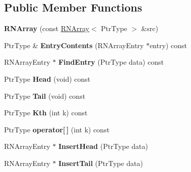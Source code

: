 \subsection*{Public Member Functions}
\begin{DoxyCompactItemize}
\item 
{\bfseries R\+N\+Array} (const \hyperlink{class_r_n_array}{R\+N\+Array}$<$ Ptr\+Type $>$ \&src)\hypertarget{class_r_n_array_ac2eee7cfca9c362f03465d1bc3858696}{}\label{class_r_n_array_ac2eee7cfca9c362f03465d1bc3858696}

\item 
Ptr\+Type \& {\bfseries Entry\+Contents} (R\+N\+Array\+Entry $\ast$entry) const \hypertarget{class_r_n_array_a24474800ce38b340d8aab3df47435c5a}{}\label{class_r_n_array_a24474800ce38b340d8aab3df47435c5a}

\item 
R\+N\+Array\+Entry $\ast$ {\bfseries Find\+Entry} (Ptr\+Type data) const \hypertarget{class_r_n_array_a59e89078bf4a08ad6a21dfa59a00ec8f}{}\label{class_r_n_array_a59e89078bf4a08ad6a21dfa59a00ec8f}

\item 
Ptr\+Type {\bfseries Head} (void) const \hypertarget{class_r_n_array_a6b4efc0426029441352b931a7e6d0f64}{}\label{class_r_n_array_a6b4efc0426029441352b931a7e6d0f64}

\item 
Ptr\+Type {\bfseries Tail} (void) const \hypertarget{class_r_n_array_a2326c69628824229a77eef284d7d7d97}{}\label{class_r_n_array_a2326c69628824229a77eef284d7d7d97}

\item 
Ptr\+Type {\bfseries Kth} (int k) const \hypertarget{class_r_n_array_aacbf5319c66292ae6dfa2488b12ec2fd}{}\label{class_r_n_array_aacbf5319c66292ae6dfa2488b12ec2fd}

\item 
Ptr\+Type {\bfseries operator\mbox{[}$\,$\mbox{]}} (int k) const \hypertarget{class_r_n_array_abe7e7cf5d11cb23342ea8047a0ea83eb}{}\label{class_r_n_array_abe7e7cf5d11cb23342ea8047a0ea83eb}

\item 
R\+N\+Array\+Entry $\ast$ {\bfseries Insert\+Head} (Ptr\+Type data)\hypertarget{class_r_n_array_ada7a1bafa4a58b950e067abc8037b45a}{}\label{class_r_n_array_ada7a1bafa4a58b950e067abc8037b45a}

\item 
R\+N\+Array\+Entry $\ast$ {\bfseries Insert\+Tail} (Ptr\+Type data)\hypertarget{class_r_n_array_ad63299032e195744aeb8574063706aa0}{}\label{class_r_n_array_ad63299032e195744aeb8574063706aa0}


\end{DoxyCompactItemize}
